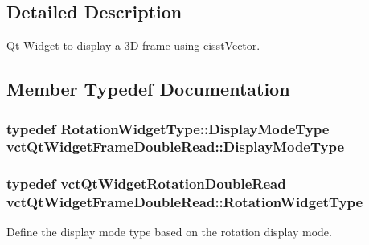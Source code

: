 \subsection{Detailed Description}
Qt Widget to display a 3\-D frame using cisst\-Vector. 

\subsection{Member Typedef Documentation}
\hypertarget{classvct_qt_widget_frame_double_read_afeb1fb838730eda5701c59fd3bc010db}{
\subsubsection[{Display\-Mode\-Type}]{\setlength{\rightskip}{0pt plus 5cm}typedef {\bf Rotation\-Widget\-Type\-::\-Display\-Mode\-Type} {\bf vct\-Qt\-Widget\-Frame\-Double\-Read\-::\-Display\-Mode\-Type}}}\label{classvct_qt_widget_frame_double_read_afeb1fb838730eda5701c59fd3bc010db}
\hypertarget{classvct_qt_widget_frame_double_read_ad3cec78c5f6f6bb0b0defc37f59609f3}{
\subsubsection[{Rotation\-Widget\-Type}]{\setlength{\rightskip}{0pt plus 5cm}typedef {\bf vct\-Qt\-Widget\-Rotation\-Double\-Read} {\bf vct\-Qt\-Widget\-Frame\-Double\-Read\-::\-Rotation\-Widget\-Type}}}\label{classvct_qt_widget_frame_double_read_ad3cec78c5f6f6bb0b0defc37f59609f3}
Define the display mode type based on the rotation display mode. 

